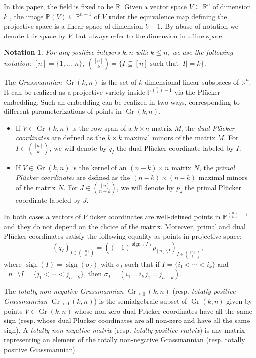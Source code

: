 \documentclass[english]{ourlematema}
\newtheorem{notation}[thm]{Notation}
\DeclareMathOperator{\Gr}{Gr}
\DeclareMathOperator{\sign}{sign}
\newcommand{\RR}{\mathbb{R}}
\newcommand{\PP}{\mathbb{P}}
\begin{document}
In this paper, the field is fixed to be $\RR$. Given a vector space $V\subseteq \RR^n$ of dimension $k$ , the image $\PP(V)\subseteq \PP^{n-1}$ of $V$ under the equivalence map defining the projective space is a linear space of dimension $k-1$. By abuse of notation we denote this space by $V$, but always refer to the dimension in affine space. 

\begin{notation} For any positive integers $k,n$ with $k\leq n$, we use the following notation: $[n]=\{1,\ldots, n\}$, $\binom{[n]}{k} = \{ I\subseteq [n] \text{ such that } |I| =k \}$.
\end{notation}

\vspace{5pt}
The \emph{Grassmannian} $\Gr(k,n)$ is the set of $k$-dimensional linear subspaces of $\RR^n$.
It can be realized as a projective variety inside $\PP^{\binom{n}{k}-1}$ via the Pl\"ucker embedding. Such an embedding can be realized in two ways, corresponding to different parameterizations of points in $\Gr(k,n)$.
\begin{itemize}
    \item If $V\in \Gr(k,n)$ is the row-span of a $k\times n$ matrix $M$, the \emph{dual Pl\"ucker coordinates} are defined as the $k\times k$ maximal minors of the matrix $M$. For $I\in \binom{[n]}{k}$, we will denote by $q_I$ the dual Pl\"ucker coordinate labeled by $I$.
    \item If $V\in \Gr(k,n)$ is the kernel of an $(n-k)\times n$ matrix $N$, the \emph{primal Pl\"ucker coordinates} are defined as the $(n-k)\times (n-k)$ maximal minors of the matrix $N$. For $J\in \binom{[n]}{n-k}$, we will denote by $p_J$ the primal Pl\"ucker coordinate labeled by $J$.
\end{itemize}
In both cases a vectors of Pl\"ucker coordinates are well-defined points in $\PP^{\binom{n}{k}-1}$ and they do not depend on the choice of the matrix. Moreover, primal and dual Pl\"ucker coordinates satisfy the following equality as points in projective space:
\[ (q_I)_{I\in \binom{[n]}{k}} = ((-1)^{\sign(I)} p_{[n]\setminus I})_{I\in \binom{[n]}{k}}, \]
where $\sign(I)= \sign(\sigma_I)$ with $\sigma_I$ such that if $I=\{ i_1<\cdots < i_{k} \}$ and $[n]\setminus I = \{j_1<\cdots < j_{n-k}\}$, then $\sigma_I = (i_1\, \ldots\, i_{k}\, j_1\, \ldots\, j_{n-k})$.

\begin{dfn}
    The \emph{totally non-negative Grassmannian} $\Gr_{\geq 0}(k,n)$ (resp. {\em totally positive Grassmannian} $\Gr_{>0}(k,n)$) is the semialgebraic subset of $\Gr(k,n)$ given by points $V\in \Gr(k,n)$ whose non-zero dual Pl\"ucker coordinates have all the same sign (resp. whose dual Pl\"ucker coordinates are all non-zero and have all the same sign). A {\em totally non-negative matrix} (resp. {\em totally positive matrix}) is any matrix representing an element of the totally non-negative Grassmannian (resp. totally positive Grassmannian).
\end{dfn}
\end{document}
